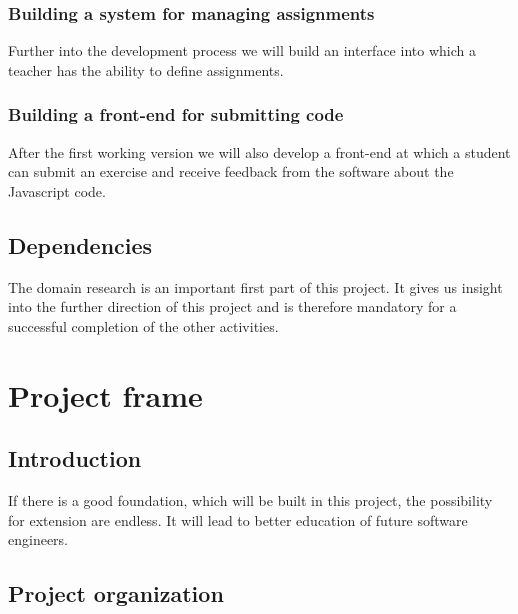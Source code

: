 \documentclass{article}
\begin{document}
\subsubsection{Building a system for managing assignments}
Further into the development process we will build an interface into which a teacher has the ability to define assignments.
\subsubsection{Building a front-end for submitting code}
After the first working version we will also develop a front-end at which a student can submit an exercise and receive feedback from the software about the Javascript code.
\subsection{Dependencies}
The domain research is an important first part of this project. It gives us insight into the further direction of this project and is therefore mandatory for a successful completion of the other activities.

\section{Project frame}

\subsection{Introduction}

If there is a good foundation, which will be built in this project, the possibility for extension are endless. It will lead to better education of future software engineers.  

\subsection{Project organization}
\end{document}
